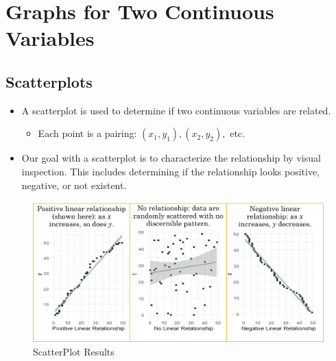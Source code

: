 \documentclass[
  letterpaper,
  DIV=11,
  numbers=noendperiod]{scrreprt}
\providecommand{\tightlist}{%
  \setlength{\itemsep}{0pt}\setlength{\parskip}{0pt}}\usepackage{longtable,booktabs,array}
\begin{document}
\section{Graphs for Two Continuous
Variables}\label{graphs-for-two-continuous-variables}

\subsection{Scatterplots}\label{scatterplots}

\begin{itemize}
\tightlist
\item
  A scatterplot is used to determine if two continuous variables are
  related.

  \begin{itemize}
  \tightlist
  \item
    Each point is a pairing: \((x_1, y_1),(x_2, y_2),\) etc.
  \end{itemize}
\item
  Our goal with a scatterplot is to characterize the relationship by
  visual inspection. This includes determining if the relationship looks
  positive, negative, or not existent.
\end{itemize}

\begin{figure}[H]

{\centering \includegraphics{Pictures/Ch3/Scatter.png}

}

\caption{ScatterPlot Results}

\end{figure}%
\end{document}
